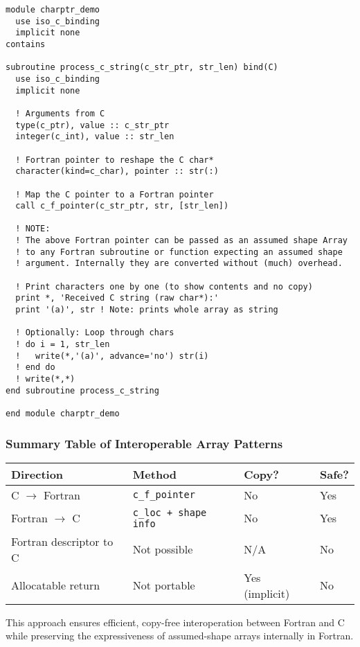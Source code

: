 \documentclass{article}
\begin{document}
\begin{verbatim}
module charptr_demo
  use iso_c_binding
  implicit none
contains

subroutine process_c_string(c_str_ptr, str_len) bind(C)
  use iso_c_binding
  implicit none

  ! Arguments from C
  type(c_ptr), value :: c_str_ptr
  integer(c_int), value :: str_len

  ! Fortran pointer to reshape the C char*
  character(kind=c_char), pointer :: str(:)

  ! Map the C pointer to a Fortran pointer
  call c_f_pointer(c_str_ptr, str, [str_len])

  ! NOTE:
  ! The above Fortran pointer can be passed as an assumed shape Array
  ! to any Fortran subroutine or function expecting an assumed shape
  ! argument. Internally they are converted without (much) overhead. 

  ! Print characters one by one (to show contents and no copy)
  print *, 'Received C string (raw char*):'
  print '(a)', str ! Note: prints whole array as string

  ! Optionally: Loop through chars
  ! do i = 1, str_len
  !   write(*,'(a)', advance='no') str(i)
  ! end do
  ! write(*,*)
end subroutine process_c_string

end module charptr_demo
\end{verbatim}

\subsubsection*{Summary Table of Interoperable Array Patterns}

\begin{center}
\begin{tabular}{|l|l|l|l|}
\hline
\textbf{Direction} & \textbf{Method} & \textbf{Copy?} & \textbf{Safe?} \\
\hline
C $\rightarrow$ Fortran & \texttt{c\_f\_pointer} & No & Yes \\
Fortran $\rightarrow$ C & \texttt{c\_loc + shape info} & No & Yes \\
Fortran descriptor to C & Not possible & N/A & No \\
Allocatable return & Not portable & Yes (implicit) & No \\
\hline
\end{tabular}
\end{center}

This approach ensures efficient, copy-free interoperation between Fortran and C while preserving the expressiveness of assumed-shape arrays internally in Fortran.
\end{document}
